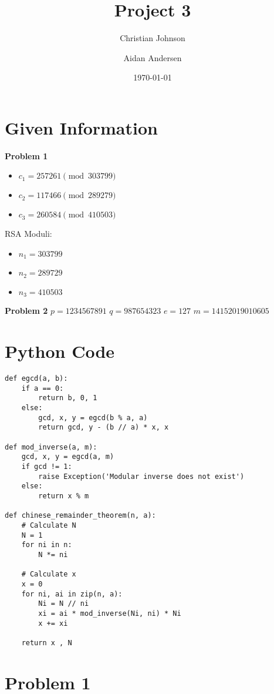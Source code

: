 \documentclass[11pt]{article}
\author{Christian Johnson \and Aidan Andersen}
\date{\today}
\title{Project 3}
\begin{document}
\maketitle
\tableofcontents

\newpage

\section{Given Information}
\label{sec:orgf6b4b0b}
\textbf{Problem 1}
\begin{itemize}
\item \(c_1=257261 \pmod{303799}\)
\item \(c_2 = 117466\pmod{289279}\)
\item \(c_3=260584\pmod{410503}\)
\end{itemize}

RSA Moduli:
\begin{itemize}
\item \(n_1=303799\)
\item \(n_2=289729\)
\item \(n_3=410503\)
\end{itemize}

\textbf{Problem 2}
\(p=1234567891\)
\(q=987654323\)
\(e=127\)
\(m=14152019010605\)

\section{Python Code}
\label{sec:org8c0089d}

\begin{verbatim}
def egcd(a, b):
    if a == 0:
        return b, 0, 1
    else:
        gcd, x, y = egcd(b % a, a)
        return gcd, y - (b // a) * x, x

def mod_inverse(a, m):
    gcd, x, y = egcd(a, m)
    if gcd != 1:
        raise Exception('Modular inverse does not exist')
    else:
        return x % m

def chinese_remainder_theorem(n, a):
    # Calculate N
    N = 1
    for ni in n:
        N *= ni

    # Calculate x
    x = 0
    for ni, ai in zip(n, a):
        Ni = N // ni
        xi = ai * mod_inverse(Ni, ni) * Ni
        x += xi

    return x , N

\end{verbatim}

\section{Problem 1}
\label{sec:orge3c6e68}
\end{document}
